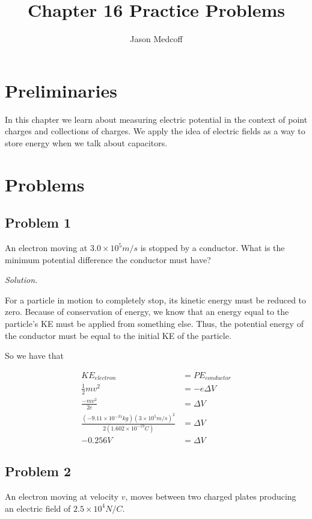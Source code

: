 \documentclass{article}
\title{Chapter 16 Practice Problems}
\author{Jason Medcoff}
\date{}
\begin{document}
	
	\maketitle
	
	\section{Preliminaries}
	In this chapter we learn about measuring electric potential in the context of point charges and collections of charges. We apply the idea of electric fields as a way to store energy when we talk about capacitors.
	
	\section{Problems}
	
	\subsection{Problem 1}
	
	An electron moving at $3.0 \times 10^5 m/s$ is stopped by a conductor. What is the minimum potential difference the conductor must have? 
	
	\textit{Solution.}
	
	For a particle in motion to completely stop, its kinetic energy must be reduced to zero. Because of conservation of energy, we know that an energy equal to the particle's KE must be applied from something else. Thus, the potential energy of the conductor must be equal to the initial KE of the particle.
	
	So we have that
	
	\begin{equation*}
	\begin{split}
	KE_{electron} & = PE_{conductor} \\
	\frac{1}{2}mv^2 & = -e \Delta V \\
	\frac{-mv^2}{2e} & = \Delta V \\
	\frac{(-9.11 \times 10^{-31} kg)(3 \times 10^5 m/s)^2}{2(1.602 \times 10^{-19} C)} & = \Delta V \\
	-0.256 V & = \Delta V
	\end{split}
	\end{equation*}
	
	\subsection{Problem 2}
	
	An electron moving at velocity $v$, moves between two charged plates producing an electric field of $2.5 \times 10^4 N/C$. 
	
	
	
	
	
	
	
	
	
\end{document}
